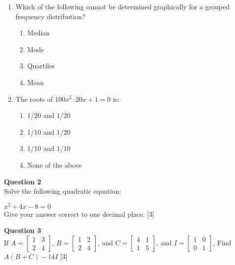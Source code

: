 \begin{enumerate}[label=(\roman*)]
    \item Which of the following cannot be determined graphically for a grouped frequency distribution? 

        \begin{enumerate}[label=(\alph*)]
            \item Median
            \item Mode
            \item Quartiles
            \item Mean
        \end{enumerate}

    \item The roots of $100x^2 – 20x + 1 = 0$ is:

        \begin{enumerate}[label=(\alph*)]
            \item 1/20 and 1/20 
            \item 1/10 and 1/20 
            \item 1/10 and 1/10
            \item None of the above
        \end{enumerate}

\end{enumerate}

\vspace{5mm}
\par
\noindent
\textbf{Question 2}\\
Solve the following quadratic equation:

$x^2 + 4x - 8 = 0$ \\
Give your answer correct to one decimal place. \hfill [3]
        
\vspace{5mm}
\par
\noindent
\textbf{Question 3}\\
If $A = \begin{bmatrix} 1 & 3\\ 2 & 4 \end{bmatrix}$, 
$B = \begin{bmatrix} 1 & 2\\ 2 & 4 \end{bmatrix}$, and
$C = \begin{bmatrix} 4 & 1\\ 1 & 5 \end{bmatrix}$, and
$I = \begin{bmatrix} 1 & 0\\ 0 & 1 \end{bmatrix}$, Find $A(B+C) - 14I$ \hfill [3]

\newpage
